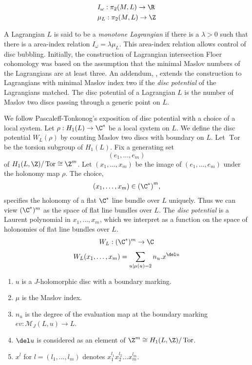\begin{align*}
    & I_\omega : \pi_2(M, L) \to \R \\
    &\mu_L : \pi_2(M, L) \to \Z  
\end{align*}

\noindent A Lagrangian $L$ is said to be a \textit{monotone Lagrangian} if there is a $\lambda>0$  such that there is a area-index relation $I_\omega = \lambda \mu_L $.  This area-index relation allows control of disc bubbling.  Initially, the construction of Lagrangian intersection Floer cohomology was based on the assumption that the minimal Maslov numbers of the Lagrangians are at least three.  An addendum, \cite{oh:addendum}, extends the construction to Lagrangians with minimal Maslov index two if the \textit{disc potential} of the Lagrangians matched.  The disc potential of a Lagrangian $L$ is the number of Maslov two discs passing through a generic point on $L$.  

We follow Pascaleff-Tonkonog's exposition of disc potential with a choice of a local system.   Let $\rho:H_1(L)\to \C^*$ be a local system on $L$. We define the disc potential $W_L(\rho)$ by counting Maslov two discs with boundary on $L$.  Let $\operatorname{Tor}$ be the torsion subgroup of $H_1(L)$.  Fix a generating set $$(e_1, \dots, e_m)$$ of $H_1(L, \Z)/\operatorname{Tor} \cong \Z^m $. Let $(x_1, \dots, x_m)$ be the image of $(e_1, \dots,  e_m)$ under the holonomy map $\rho$.   The choice, $$(x_1, \dots, x_m)\in {(\C^*)}^m,$$ specifies the holonomy of a flat $\C^*$ line bundle over $L$ uniquely.  Thus we can view $({\C^*})^m$ as the space of flat line bundles over $L$.  The \textit{disc potential} is a Laurent polynomial in  $x_1, \dots, x_m$, which we interpret as a function on the space of holonomies of flat line bundles  over $L$.  $$W_L:(\C^*)^m \to \C$$ 
$$W_L(x_1, \dots, x_m) = \sum_{u|\mu(u)=2} n_{u}. x^{\del u}$$



\begin{enumerate}
\itemsep0em 
    \item $u$ is a $J$-holomorphic disc with a boundary marking.
    \item $\mu$ is the Maslov index.
    \item $n_u$ is the degree of the evaluation map at the boundary marking $ev:\mathcal{M}_J (L, u) \to L$.
    \item $\del u$ is considered as an element of $\Z^m \cong H_1(L, \Z)/\operatorname{Tor}$.
    \item $x^l$ for $l=(l_1, \dots, l_m)$ denotes $x_1^{l_1}x_2^{l_2}\dots x_m^{l_m}$.

\end{enumerate}


